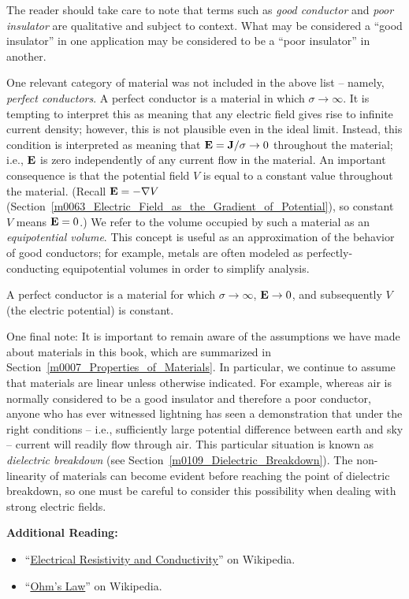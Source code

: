 The reader should take care to note that terms such as {\it good conductor} and {\it poor insulator} are qualitative and subject to context.  What may be considered a ``good insulator'' in one application may be considered to be a ``poor insulator'' in another.  

One relevant category of material was not included in the above list -- namely, \emph{perfect conductors}. 
A perfect conductor is a material in which $\sigma\to\infty$.  
It is tempting to interpret this as meaning that any electric field gives rise to infinite current density; however, this is not plausible even in the ideal limit.
Instead, this condition is interpreted as meaning that ${\bf E}={\bf J}/\sigma\to 0$ throughout the material; i.e., ${\bf E}$ is zero independently of any current flow in the material.
An important consequence is that the potential field $V$ is equal to a constant value throughout the material.  
(Recall ${\bf E}=-\nabla V$ (Section~\ref{m0063_Electric_Field_as_the_Gradient_of_Potential}), so constant $V$ means ${\bf E}=0$.)
We refer to the volume occupied by such a material as an \emph{equipotential volume}.
This concept is useful as an approximation of the behavior of good conductors; for example, metals are often modeled as perfectly-conducting equipotential volumes in order to simplify analysis.
%
\begin{mdframed}[backgroundcolor=yellow!20,nobreak=true] 
A perfect conductor 
is a material for which $\sigma\to\infty$, ${\bf E}\to 0$, and subsequently $V$ (the electric potential) is constant.  
\end{mdframed}

One final note: It is important to remain aware of the assumptions we have made about materials in this book, which are summarized in Section~\ref{m0007_Properties_of_Materials}. In particular, we continue to assume that materials are linear unless otherwise indicated.  
For example, whereas air is normally considered to be a good insulator and therefore a poor conductor, anyone who has ever witnessed lightning 
has seen a demonstration that under the right conditions -- i.e., sufficiently large potential difference between earth and sky -- current will readily flow through air.  This particular situation is known as \emph{dielectric breakdown} 
(see Section~\ref{m0109_Dielectric_Breakdown}).  The non-linearity of materials can become evident before reaching the point of dielectric breakdown, so one must be careful to consider this possibility when dealing with strong electric fields.

{\bf Additional Reading:}
\begin{itemize}
\item ``\href{https://en.wikipedia.org/wiki/Electrical_resistivity_and_conductivity}{Electrical Resistivity and Conductivity}'' on Wikipedia.
\item ``\href{https://en.wikipedia.org/wiki/Ohm's_law}{Ohm's Law}'' on Wikipedia.
\end{itemize}

